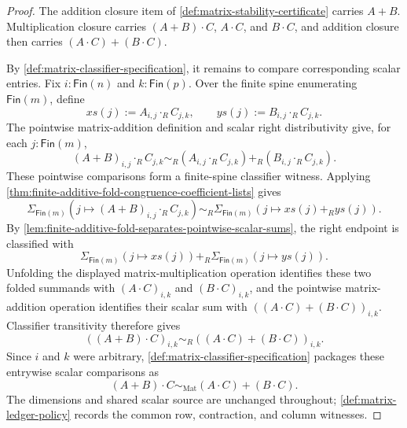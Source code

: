 \begin{proof}
The addition closure item of \autoref{def:matrix-stability-certificate} carries $A+B$. Multiplication closure carries $(A+B)\cdot C$, $A\cdot C$, and $B\cdot C$, and addition closure then carries $(A\cdot C)+(B\cdot C)$.

By \autoref{def:matrix-classifier-specification}, it remains to compare corresponding scalar entries. Fix $i:\mathsf{Fin}(n)$ and $k:\mathsf{Fin}(p)$. Over the finite spine enumerating $\mathsf{Fin}(m)$, define
$$
xs(j):=A_{i,j}\cdot_RC_{j,k},
\qquad
ys(j):=B_{i,j}\cdot_RC_{j,k}.
$$
The pointwise matrix-addition definition and scalar right distributivity give, for each $j:\mathsf{Fin}(m)$,
$$
(A+B)_{i,j}\cdot_RC_{j,k}
\sim_R
(A_{i,j}\cdot_RC_{j,k})+_R(B_{i,j}\cdot_RC_{j,k}).
$$
These pointwise comparisons form a finite-spine classifier witness. Applying \autoref{thm:finite-additive-fold-congruence-coefficient-lists} gives
$$
\Sigma_{\mathsf{Fin}(m)}(j\mapsto (A+B)_{i,j}\cdot_RC_{j,k})
\sim_R
\Sigma_{\mathsf{Fin}(m)}(j\mapsto xs(j)+_Rys(j)).
$$
By \autoref{lem:finite-additive-fold-separates-pointwise-scalar-sums}, the right endpoint is classified with
$$
\Sigma_{\mathsf{Fin}(m)}(j\mapsto xs(j))+_R
\Sigma_{\mathsf{Fin}(m)}(j\mapsto ys(j)).
$$
Unfolding the displayed matrix-multiplication operation identifies these two folded summands with $(A\cdot C)_{i,k}$ and $(B\cdot C)_{i,k}$, and the pointwise matrix-addition operation identifies their scalar sum with $((A\cdot C)+(B\cdot C))_{i,k}$. Classifier transitivity therefore gives
$$
((A+B)\cdot C)_{i,k}\sim_R((A\cdot C)+(B\cdot C))_{i,k}.
$$
Since $i$ and $k$ were arbitrary, \autoref{def:matrix-classifier-specification} packages these entrywise scalar comparisons as
$$
(A+B)\cdot C\sim_{\mathrm{Mat}}(A\cdot C)+(B\cdot C).
$$
The dimensions and shared scalar source are unchanged throughout; \autoref{def:matrix-ledger-policy} records the common row, contraction, and column witnesses.
\end{proof}
